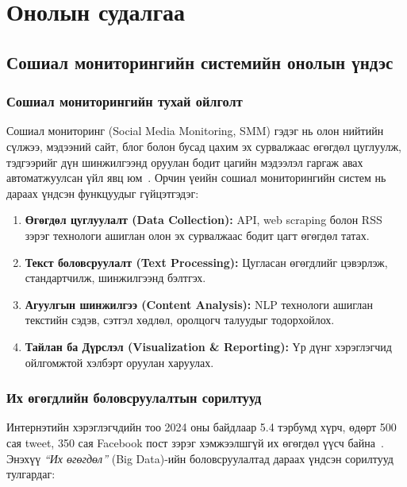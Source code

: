 \chapter{Онолын судалгаа}

\section{Сошиал мониторингийн системийн онолын үндэс}

\subsection{Сошиал мониторингийн тухай ойлголт}

Сошиал мониторинг (Social Media Monitoring, SMM) гэдэг нь олон нийтийн сүлжээ, мэдээний сайт, блог болон бусад цахим эх сурвалжаас өгөгдөл цуглуулж, тэдгээрийг дүн шинжилгээнд оруулан бодит цагийн мэдээлэл гаргаж авах автоматжуулсан үйл явц юм~\cite{kaplan2010social}. 
Орчин үеийн сошиал мониторингийн систем нь дараах үндсэн функцуудыг гүйцэтгэдэг:
\begin{enumerate}
    \item \textbf{Өгөгдөл цуглуулалт (Data Collection):} API, web scraping болон RSS зэрэг технологи ашиглан олон эх сурвалжаас бодит цагт өгөгдөл татах.
    \item \textbf{Текст боловсруулалт (Text Processing):} Цугласан өгөгдлийг цэвэрлэж, стандартчилж, шинжилгээнд бэлтгэх.
    \item \textbf{Агуулгын шинжилгээ (Content Analysis):} NLP технологи ашиглан текстийн сэдэв, сэтгэл хөдлөл, оролцогч талуудыг тодорхойлох.
    \item \textbf{Тайлан ба Дүрслэл  (Visualization \& Reporting):} Үр дүнг хэрэглэгчид ойлгомжтой хэлбэрт оруулан харуулах.
\end{enumerate}

\subsection{Их өгөгдлийн боловсруулалтын сорилтууд}

Интернэтийн хэрэглэгчдийн тоо 2024 оны байдлаар 5.4 тэрбумд хүрч, өдөрт 500 сая tweet, 350 сая Facebook пост зэрэг хэмжээлшгүй их өгөгдөл үүсч байна~\cite{statista2024}. Энэхүү \textit{``Их өгөгдөл''} (Big Data)-ийн боловсруулалтад дараах үндсэн сорилтууд тулгардаг:

